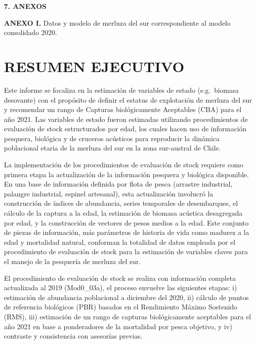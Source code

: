 \documentclass[
  spanish,
]{article}
\author{}
\date{\vspace{-2.5em}}
\begin{document}
{
\setcounter{tocdepth}{3}
\tableofcontents
}
\textbf{7. ANEXOS}

\textbf{ANEXO I.} Datos y modelo de merluza del sur correspondiente al
modelo consolidado 2020.

\pagebreak

\hypertarget{resumen-ejecutivo}{%
\section{RESUMEN EJECUTIVO}\label{resumen-ejecutivo}}

Este informe se focaliza en la estimación de variables de estado
(e.g.~biomasa desovante) con el propósito de definir el estatus de
explotación de merluza del sur y recomendar un rango de Capturas
biológicamente Aceptables (CBA) para el año 2021. Las variables de
estado fueron estimadas utilizando procedimientos de evaluación de stock
estructurados por edad, los cuales hacen uso de información pesquera,
biológica y de cruceros acústicos para reproducir la dinámica
poblacional etaria de la merluza del sur en la zona sur-austral de
Chile.

La implementación de los procedimientos de evaluación de stock requiere
como primera etapa la actualización de la información pesquera y
biológica disponible. En una base de información definida por flota de
pesca (arrastre industrial, palangre industrial, espinel artesanal),
esta actualización involucró la construcción de índices de abundancia,
series temporales de desembarques, el cálculo de la captura a la edad,
la estimación de biomasa acústica desagregada por edad, y la
construcción de vectores de pesos medios a la edad. Este conjunto de
piezas de información, más parámetros de historia de vida como madurez a
la edad y mortalidad natural, conforman la totalidad de datos empleada
por el procedimiento de evaluación de stock para la estimación de
variables claves para el manejo de la pesquería de merluza del sur.

El procedimiento de evaluación de stock se realiza con información
completa actualizada al 2019 (Mod0\_03a), el proceso envuelve las
siguientes etapas: i) estimación de abundancia poblacional a diciembre
del 2020, ii) cálculo de puntos de referencia biológicos (PBR) basados
en el Rendimiento Máximo Sostenido (RMS), iii) estimación de un rango de
capturas biológicamente aceptables para el año 2021 en base a
ponderadores de la mortalidad por pesca objetivo, y iv) contraste y
consistencia con asesorías previas.
\end{document}
